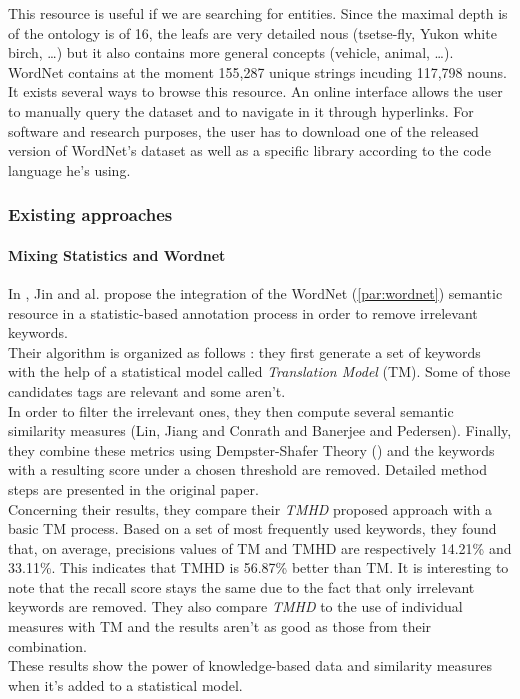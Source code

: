 This resource is useful if we are searching for entities. Since the maximal depth is of the ontology is of 16, the leafs are very detailed nous (tsetse-fly, Yukon white birch, \dots) but it also contains more general concepts (vehicle, animal, \dots). WordNet contains at the moment 155,287 unique strings incuding 117,798 nouns.\\ 

It exists several ways to browse this resource. An online interface allows the user to manually query the dataset and to navigate in it through hyperlinks. For software and research purposes, the user has to download one of the released version of WordNet's dataset as well as a specific library according to the code language he's using.\\

\subsubsection{Existing approaches} %
\label{ssub:existing_approaches}

\paragraph{Mixing Statistics and Wordnet} %
\label{par:mixing_statistics_and_wordnet}
In \cite{jin}, Jin and al. propose the integration of the WordNet (\ref{par:wordnet}) semantic resource in a statistic-based annotation process in order to remove irrelevant keywords.\\

Their algorithm is organized as follows : they first generate a set of keywords with the help of a statistical model called \emph{Translation Model} (TM). Some of those candidates tags are relevant and some aren't.\\
In order to filter the irrelevant ones, they then compute several semantic similarity measures (Lin, Jiang and Conrath and Banerjee and Pedersen). Finally, they combine these metrics using Dempster-Shafer Theory (\cite{shafer}) and the keywords with a resulting score under a chosen threshold are removed. Detailed method steps are presented in the original paper. \\

Concerning their results, they compare their \emph{TMHD} proposed approach with a basic TM process. Based on a set of most frequently used keywords, they found that, on average, precisions values of TM and TMHD are respectively 14.21\% and 33.11\%. This indicates that TMHD is 56.87\% better than TM. It is interesting to note that the recall score stays the same due to the fact that only irrelevant keywords are removed. They also compare \emph{TMHD} to the use of individual measures with TM and the results aren't as good as those from their combination.\\
These results show the power of knowledge-based data and similarity measures when it's added to a statistical model.

